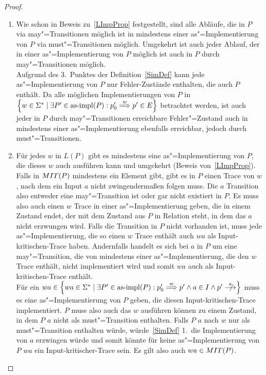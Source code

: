 \begin{proof}\mbox{}
  \begin{enumerate}
    \item Wie schon in Beweis zu~\ref{LImpProp} festgestellt, sind alle
      Abläufe, die in $P$ via may"=Transitionen möglich ist in mindestens einer
      as"=Implementierung von $P$ via must"=Transitionen möglich. Umgekehrt ist
      auch jeder Ablauf, der in einer as"=Implementierung von $P$ möglich ist
      auch in $P$ durch may"=Transitionen möglich.\\
      Aufgrund des 3.\ Punktes der Definition~\ref{SimDef} kann jede
      as"=Implementierung von $P$ nur Fehler-Zustände enthalten,
      die auch $P$ enthält. Da alle möglichen Implementierungen von $P$ in
      $\left\{w\in\Sigma ^* \mid \exists P' \in\asimp (P) : p'_0 \weakmust[w]
      p' \in E\right\}$ betrachtet werden, ist auch jeder in $P$ durch
      may"=Transitionen erreichbare Fehler"=Zustand auch in
      mindestens einer as"=Implementierung ebenfalls erreichbar, jedoch durch
      must"=Transitionen.
    \item Für jedes $w$ in $L(P)$ gibt es mindestens eine as"=Implementierung
      von $P$, die dieses $w$ auch ausführen kann und umgekehrt (Beweis
      von~\ref{LImpProp}). Falls in $MIT (P)$ mindestens ein Element gibt,
      gibt es in $P$ einen Trace von $w$, nach dem ein Input $a$ nicht
      zwingendermaßen folgen muss. Die $a$ Transition also entweder eine
      may"=Transition ist oder gar nicht existiert in $P$. Es muss also auch
      einen $w$ Trace in einer as"=Implementierung geben, die in einem Zustand
      endet, der mit dem Zustand aus $P$ in Relation steht, in dem das $a$
      nicht erzwungen wird. Falls die Transition in $P$ nicht vorhanden ist,
      muss jede as"=Implementierung, die so einen $w$ Trace enthält auch $wa$
      als Input-kritischen-Trace haben. Andernfalls handelt es sich bei $a$ in
      $P$ um eine may"=Transition, die von mindestens einer
      as"=Implementierung, die den $w$ Trace enthält, nicht implementiert wird
      und somit $wa$ auch als Input-kritischen-Trace enthält.\\
      Für ein $wa\in \left\{wa\in\Sigma ^* \mid \exists P' \in\asimp (P) : p'_0
      \weakmust[w] p' \land a\in I\land p'\nmust[a] \right\}$ muss es eine
      as"=Implementierung von $P$ geben, die diesen Input-kritischen-Trace
      implementiert. $P$ muss also auch das $w$ ausführen können zu einem
      Zustand, in dem $P$ $a$ nicht als must"=Transition enthalten. Falls $P$
      $a$ nach $w$ nur als must"=Transition enthalten würde, würde~\ref{SimDef}
      1.\ die Implementierung von $a$ erzwingen würde und somit könnte für
      keine as"=Implementierung von $P$ $wa$ ein Input-kritischer-Trace sein.
      Es gilt also auch $wa\in MIT (P)$.
  \end{enumerate}
\end{proof}

